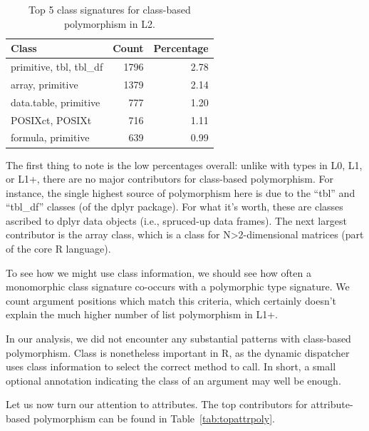 \documentclass[acmsmall,10pt,review,anonymous]{acmart}\settopmatter{printfolios=true,printccs=false,printacmref=false}
\begin{document}
\begin{table}[ht]
\label{tab:classpolyL2}
\centering
\begin{tabular}{lrr}
  \hline
Class & Count & Percentage \\
  \hline
  primitive, tbl, tbl\_df & 1796 & 2.78 \\
  array, primitive & 1379 & 2.14 \\
  data.table, primitive & 777 & 1.20 \\
  POSIXct, POSIXt & 716 & 1.11 \\
  formula, primitive & 639 & 0.99 \\
   \hline
\end{tabular}
\caption{Top 5 class signatures for class-based polymorphism in L2.}
\end{table}


The first thing to note is the low percentages overall: unlike with types in L0, L1, or L1+, there are no major contributors for class-based polymorphism.
For instance, the single highest source of polymorphism here is due to the ``tbl'' and ``tbl\_df'' classes (of the dplyr package).
For what it's worth, these are classes ascribed to dplyr data objects (i.e., spruced-up data frames).
The next largest contributor is the array class, which is a class for N>2-dimensional matrices (part of the core R language).

To see how we might use class information, we should see how often a monomorphic class signature co-occurs with a polymorphic type signature.
We count \NUMPOLYTYPEMONOCLASS argument positions which match this criteria, which certainly doesn't explain the much higher number of list polymorphism in L1+.

In our analysis, we did not encounter any substantial patterns with class-based polymorphism.
Class is nonetheless important in R, as the dynamic dispatcher uses class information to select the correct method to call.
In short, a small optional annotation indicating the class of an argument may well be enough.

Let us now turn our attention to attributes.
The top contributors for attribute-based polymorphism can be found in Table~\ref{tab:topattrpoly}.
\end{document}
